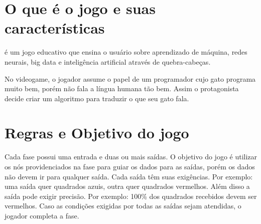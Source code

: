 \documentclass[12pt,oneside,a4paper,chapter=TITLE,section=TITLE,sumario
=tradicional]{abntex2}
\begin{document}

\imprimircapa
\imprimirfolhaderosto

\sumario

\textual

\chapter{O que é o jogo e suas características}
\label{cap:o-que-eh-o-jogo-e-suas-caracteristicas}

 é um jogo educativo que ensina o usuário sobre aprendizado de máquina, redes neurais, big data e inteligência artificial através de quebra-cabeças.

No videogame, o jogador assume o papel de um programador cujo gato programa muito bem, porém não fala a língua humana tão bem. Assim o protagonista decide criar um algoritmo para traduzir o que seu gato fala.

\chapter{Regras e Objetivo do jogo}
\label{cap:regras-e-objetivo-do-jogo}

Cada fase possui uma entrada e duas ou mais saídas. O objetivo do jogo é utilizar os nós providenciados na fase para guiar os dados para as saídas, porém os dados não devem ir para qualquer saída. Cada saída têm suas exigências. Por exemplo: uma saída quer quadrados azuis, outra quer quadrados vermelhos. Além disso a saída pode exigir precisão. Por exemplo: 100\% dos quadrados recebidos devem ser vermelhos. Caso as condições exigidas por todas as saídas sejam atendidas, o jogador completa a fase.
\end{document}
